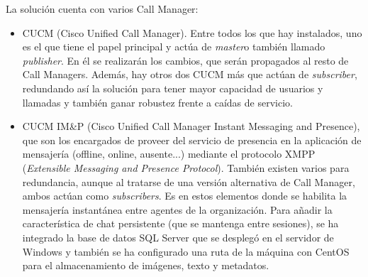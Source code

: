 \documentclass[a4paper, 12pt]{book}
\begin{document}
La solución cuenta con varios Call Manager:
\begin{itemize}
  \item CUCM (Cisco Unified Call Manager). Entre todos los que hay instalados, uno es el que tiene el papel principal y actúa de \emph{master}o también llamado \emph{publisher}. En él se realizarán los cambios, que serán propagados al resto de Call Managers. Además, hay otros dos CUCM más que actúan de \emph{subscriber}, redundando así la solución para tener mayor capacidad de usuarios y llamadas y también ganar robustez frente a caídas de servicio.
  \item CUCM IM\&P (Cisco Unified Call Manager Instant Messaging and Presence), que son los encargados de proveer del servicio de presencia en la aplicación de mensajería (offline, online, ausente...) mediante el protocolo XMPP (\emph{Extensible Messaging and Presence Protocol}). También existen varios para redundancia, aunque al tratarse de una versión alternativa de Call Manager, ambos actúan como \emph{subscribers}.
  Es en estos elementos donde se habilita la mensajería instantánea entre agentes de la organización. Para añadir la característica de chat persistente (que se mantenga entre sesiones), se ha integrado la base de datos SQL Server que se desplegó en el servidor de Windows y también se ha configurado una ruta de la máquina con CentOS para el almacenamiento de imágenes, texto y metadatos.
\end{itemize}
\end{document}
